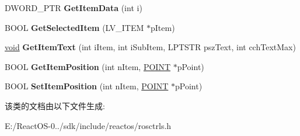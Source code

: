 \begin{DoxyCompactItemize}
D\+W\+O\+R\+D\+\_\+\+P\+TR {\bfseries Get\+Item\+Data} (int i)
\item 
\mbox{\label{class_c_list_view_a2baa92533bb7ef4576db679374534cad}} 
B\+O\+OL {\bfseries Get\+Selected\+Item} (L\+V\+\_\+\+I\+T\+EM $\ast$p\+Item)
\item 
\mbox{\label{class_c_list_view_a5239450cc7ad0b709e913afae25ae5fa}} 
\hyperlink{interfacevoid}{void} {\bfseries Get\+Item\+Text} (int i\+Item, int i\+Sub\+Item, L\+P\+T\+S\+TR psz\+Text, int cch\+Text\+Max)
\item 
\mbox{\label{class_c_list_view_adc00ef2519b504081a71ba672f6a52e4}} 
B\+O\+OL {\bfseries Get\+Item\+Position} (int n\+Item, \hyperlink{structtag_p_o_i_n_t}{P\+O\+I\+NT} $\ast$p\+Point)
\item 
\mbox{\label{class_c_list_view_a91e5569482279129f833e43d5af16891}} 
B\+O\+OL {\bfseries Set\+Item\+Position} (int n\+Item, \hyperlink{structtag_p_o_i_n_t}{P\+O\+I\+NT} $\ast$p\+Point)
\end{DoxyCompactItemize}


该类的文档由以下文件生成\+:\begin{DoxyCompactItemize}
\item 
E\+:/\+React\+O\+S-\/0../sdk/include/reactos/rosctrls.\+h\end{DoxyCompactItemize}
